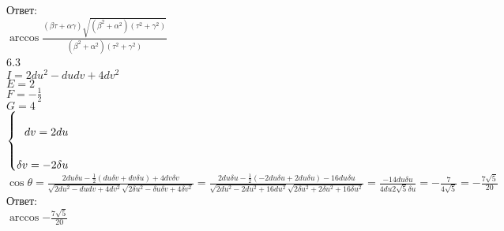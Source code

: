 \documentclass[a4paper, 12pt]{article}
\begin{document}
Ответ: \\
$\arccos{\frac{(\beta\tau+\alpha\gamma)\sqrt{(\beta^2+\alpha^2)(\tau^2+\gamma^2)}}{(\beta^2+\alpha^2)(\tau^2+\gamma^2)}}$ \\
6.3 \\
$I=2d{u}^2-d{u}d{v}+4d{v}^2$ \\
$E=2$ \\
$F=-\frac{1}{2}$ \\
$G=4$ \\
$\left\{ \\
\begin{aligned} \\
d{v}=2d{u}\\ \\
\delta{v}=-2\delta{u} \\
\end{aligned} \\
\right.$ \\
$\cos{\theta}=\frac{2d{u}\delta{u}-\frac{1}{2}(d{u}\delta{v}+d{v}\delta{u})+4d{v}\delta{v}}{\sqrt{2d{u}^2-d{u}d{v}+4d{v}^2}\sqrt{2\delta{u}^2-\delta{u}\delta{v}+4\delta{v}^2}}=\frac{2d{u}\delta{u}-\frac{1}{2}(-2d{u}\delta{u}+2d{u}\delta{u})-16d{u}\delta{u}}{\sqrt{2d{u}^2-2d{u}^2+16d{u}^2}\sqrt{2\delta{u}^2+2\delta{u}^2+16\delta{u}^2}}=\frac{-14d{u}\delta{u}}{4d{u}2\sqrt{5}\delta{u}}=-\frac{7}{4\sqrt{5}}=-\frac{7\sqrt{5}}{20}$ \\
Ответ: \\
$\arccos{-\frac{7\sqrt{5}}{20}}$
\end{document}
